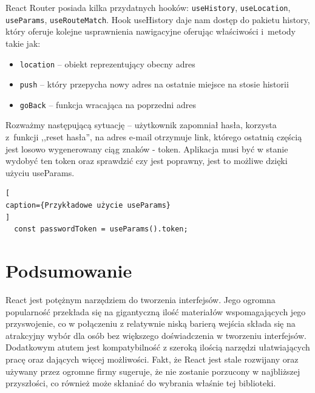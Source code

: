 \documentclass[oneside,polski,logo,indent]{amuthesis}
\begin{document}
React Router posiada kilka przydatnych hooków: \texttt{useHistory}, \texttt{useLocation}, \texttt{useParams}, \texttt{useRouteMatch}. Hook useHistory daje nam dostęp do pakietu history, który oferuje kolejne usprawnienia 
nawigacyjne oferując właściwości i~metody takie jak:
\begin{itemize}
\item \texttt{location} -- obiekt reprezentujący obecny adres
\item \texttt{push} -- który przepycha nowy adres na ostatnie miejsce na stosie historii
\item \texttt{goBack} -- funkcja wracająca na poprzedni adres
\end{itemize}
Rozważmy następującą sytuację -- użytkownik zapomniał hasła, korzysta z~funkcji ,,reset hasła'', na adres e-mail otrzymuje link, którego ostatnią częścią
jest losowo wygenerowany ciąg znaków - token. Aplikacja musi być w stanie wydobyć ten token oraz sprawdzić czy jest poprawny, jest to możliwe dzięki użyciu useParams.
\begin{lstlisting}[
caption={Przykładowe użycie useParams}
]
  const passwordToken = useParams().token;
\end{lstlisting}
\section{Podsumowanie}
React jest potężnym narzędziem do tworzenia interfejsów. Jego ogromna popularność przekłada się na gigantyczną ilość materiałów wspomagających jego przyswojenie, co w połączeniu z relatywnie niską barierą wejścia składa się na atrakcyjny wybór dla osób bez większego doświadczenia w tworzeniu interfejsów.
Dodatkowym atutem jest kompatybilność z szeroką ilością narzędzi ułatwiających pracę oraz dających więcej możliwości. Fakt, że React jest stale rozwijany oraz używany przez ogromne firmy
sugeruje, że nie zostanie porzucony w najbliższej przyszłości, co również może skłaniać do wybrania właśnie tej biblioteki.
\nocite{*}
\printbibliography
\end{document}
